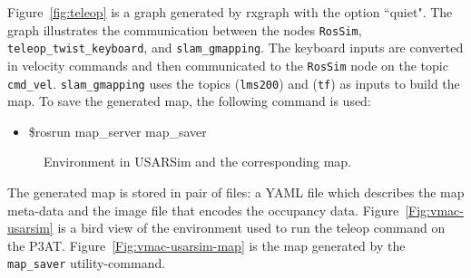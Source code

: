 Figure~\ref{fig:teleop} is a graph generated by rxgraph with the option ``quiet". The graph illustrates the communication between the nodes \texttt{RosSim}, \texttt{teleop\_twist\_keyboard}, and \texttt{slam\_gmapping}. The keyboard inputs are converted in velocity commands and then communicated to the \texttt{RosSim} node on the topic \texttt{cmd\_vel}. \texttt{slam\_gmapping} uses the topics (\texttt{lms200}) and (\texttt{tf}) as inputs to build the map. To save the generated map, the following command is used:

\begin{itemize}
\item[]\$rosrun map\_server map\_saver
\end{itemize}

\begin{figure}[t!]
\centering
{}\qquad
{}
\caption{Environment in USARSim and the corresponding map.}
\end{figure}
The generated map is stored in pair of files: a YAML file which describes the map meta-data and the image file that encodes the occupancy data. Figure~\ref{Fig:vmac-usarsim} is a bird view of the environment used to run the teleop command on the P3AT. Figure~\ref{Fig:vmac-usarsim-map} is the map generated by the \texttt{map\_saver} utility-command.






